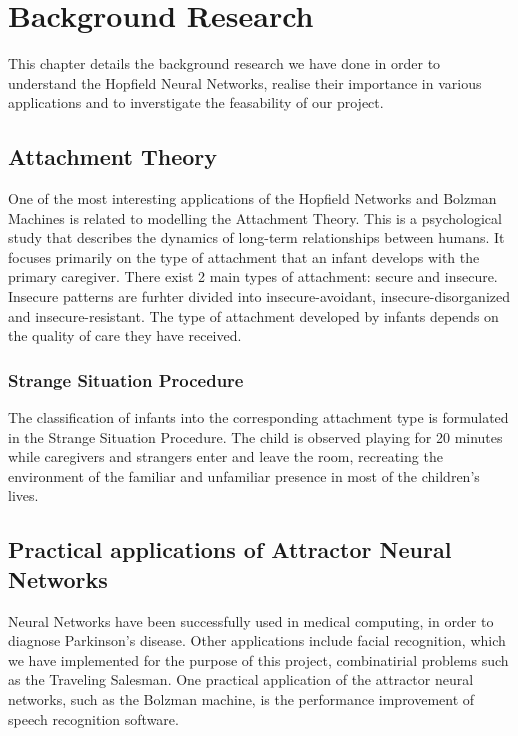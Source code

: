 \chapter{Background Research}
This chapter details the background research we have done in order to understand the Hopfield Neural Networks, realise their importance in various applications and to inverstigate the feasability of our project. 

\section{Attachment Theory}

One of the most interesting applications of the Hopfield Networks and Bolzman Machines is related to modelling the Attachment Theory. This is a psychological study that describes the dynamics of long-term relationships between humans\cite{website:attachment_theory_wiki}. It focuses primarily on the type of attachment that an infant develops with the primary caregiver. There exist 2 main types of attachment: secure and insecure. Insecure patterns are furhter divided into insecure-avoidant, insecure-disorganized and insecure-resistant. The type of attachment developed by infants depends on the quality of care they have received\cite{website:attachment_theory_wiki}.

\subsection{Strange Situation Procedure}

The classification of infants into the corresponding attachment type is formulated in the Strange Situation Procedure. The child is observed playing for 20 minutes while caregivers and strangers enter and leave the room, recreating the environment of the familiar and unfamiliar presence in most of the children's lives.\cite{website:attachment_patterns_wiki}

\section{Practical applications of Attractor Neural Networks}

Neural Networks have been successfully used in medical computing, in order to diagnose Parkinson's disease\cite{nets_parkinsons}. Other applications include facial recognition, which we have implemented for the purpose of this project, combinatirial problems such as the Traveling Salesman\cite{hopfield_laferriere}. 
One practical application of the attractor neural networks, such as the Bolzman machine, is the performance improvement of speech recognition software\cite{speech_nets}.

